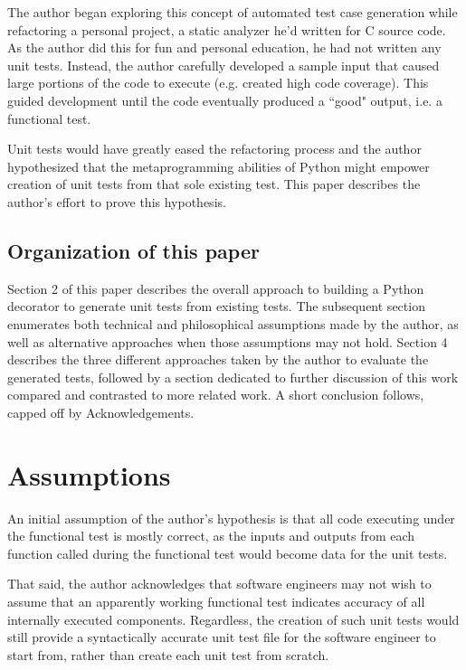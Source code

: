 \documentclass[10pt, conference]{IEEEtran}
\begin{document}
The author began exploring this concept of automated test case generation
while refactoring a personal project, a static analyzer he'd written for C source code.  As the
author did this for fun and personal education, he had not written any unit
tests.  Instead, the author carefully developed a sample input that caused large
portions of the code to execute (e.g. created high code coverage).  This guided
development until the code eventually produced a “good" output, i.e. a functional
test.
  
Unit tests would have greatly eased the refactoring process and the author 
hypothesized that the metaprogramming abilities of Python might empower creation
of unit tests from that sole existing test. This paper describes the author's
effort to prove this hypothesis.

\subsection{Organization of this paper}\label{sec:intro-5}

Section 2 of this paper describes the overall approach to building a
Python decorator to generate unit tests from existing tests. The subsequent
section enumerates both technical and philosophical assumptions made by the
author, as well as alternative approaches when those assumptions may not hold.
Section 4 describes the three different approaches taken by the author to 
evaluate the generated tests, followed by a section dedicated to further 
discussion of this work compared and contrasted to more related work.  A short
conclusion follows, capped off by Acknowledgements.

%
 \section{Assumptions}\label{sec:assumptions}

An initial assumption of the author's hypothesis is that all code executing under the
functional test is mostly correct, as the inputs and outputs from each
function called during the functional test would become data for the
unit tests.  

That said, the author acknowledges that software engineers may not 
wish to assume that an apparently working functional test indicates accuracy of 
all internally executed components. Regardless, the creation of such unit 
tests would still provide a syntactically accurate unit
test file for the software engineer to start from, rather than create each unit
test from scratch.  
\end{document}
